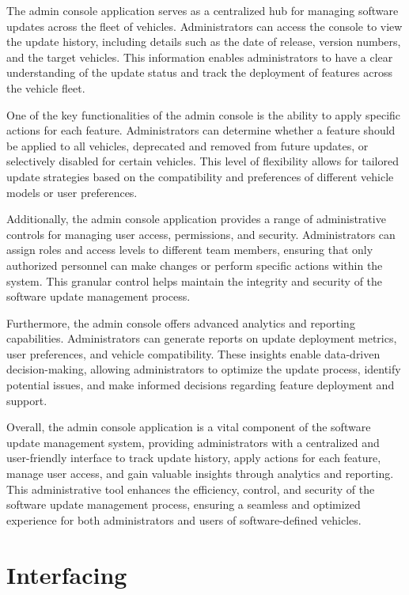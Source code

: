 \documentclass[
12pt,
oneside, 
onehalfspacing, 
nolistspacing, 
parskip, 
chapterinoneline, 
]{AASTCOMPUTER}
\begin{document}
The admin console application serves as a centralized hub for managing software updates across the fleet of vehicles. Administrators can access the console to view the update history, including details such as the date of release, version numbers, and the target vehicles. This information enables administrators to have a clear understanding of the update status and track the deployment of features across the vehicle fleet.

One of the key functionalities of the admin console is the ability to apply specific actions for each feature. Administrators can determine whether a feature should be applied to all vehicles, deprecated and removed from future updates, or selectively disabled for certain vehicles. This level of flexibility allows for tailored update strategies based on the compatibility and preferences of different vehicle models or user preferences.

Additionally, the admin console application provides a range of administrative controls for managing user access, permissions, and security. Administrators can assign roles and access levels to different team members, ensuring that only authorized personnel can make changes or perform specific actions within the system. This granular control helps maintain the integrity and security of the software update management process.

Furthermore, the admin console offers advanced analytics and reporting capabilities. Administrators can generate reports on update deployment metrics, user preferences, and vehicle compatibility. These insights enable data-driven decision-making, allowing administrators to optimize the update process, identify potential issues, and make informed decisions regarding feature deployment and support.

Overall, the admin console application is a vital component of the software update management system, providing administrators with a centralized and user-friendly interface to track update history, apply actions for each feature, manage user access, and gain valuable insights through analytics and reporting. This administrative tool enhances the efficiency, control, and security of the software update management process, ensuring a seamless and optimized experience for both administrators and users of software-defined vehicles. 

\section{Interfacing}
\end{document}
